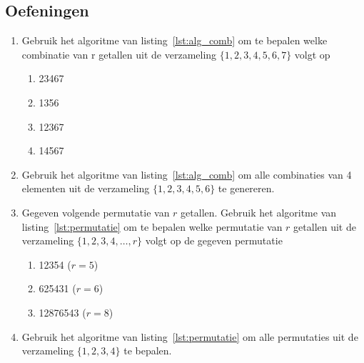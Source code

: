 \subsection{Oefeningen}
\begin{enumerate}
\item Gebruik het algoritme van listing~\ref{lst:alg_comb} om te bepalen welke combinatie van r getallen uit de verzameling $\{1,2,3,4,5,6,7\}$ volgt op
\begin{enumerate}
\item  23467
\item 1356
\item 12367
\item 14567
\end{enumerate}
\item Gebruik het algoritme van listing~\ref{lst:alg_comb} om alle combinaties van 4 elementen uit de verzameling $\{1,2,3,4,5,6\}$ te genereren.
\item Gegeven volgende permutatie van $r$ getallen. Gebruik het algoritme van listing~\ref{lst:permutatie} om te bepalen welke permutatie van $r$ getallen uit de verzameling $\{1,2,3,4,\dots,r\}$ volgt op de gegeven permutatie
\begin{enumerate}
\item 12354 ($r=5$)
\item 625431 ($r=6$)
\item 12876543 ($r=8$)
\end{enumerate}
\item Gebruik het algoritme van listing~\ref{lst:permutatie} om alle permutaties uit de verzameling $\{1,2,3,4\}$ te bepalen.
\end{enumerate}


